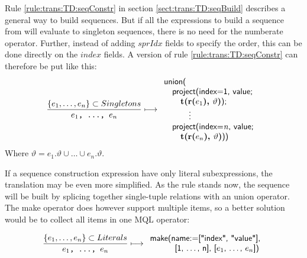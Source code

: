Rule \ref{rule:trans:TD:seqConstr} in section \ref{sect:trans:TD:seqBuild} describes a general way to build
sequences. But if all the expressions to build a sequence from will evaluate to singleton sequences, there is no
need for the \textsf{numberate} operator. Further, instead of adding $sprIdx$ fields to specify the order, this
can be done directly on the $index$ fields. A version of rule \ref{rule:trans:TD:seqConstr} can therefore be put
like this:
\begin{equation}
\frac{\left\{e_{1},\ldots,e_{n}\right\}\subset{Singletons}}{e_{1}\mbox{\texttt{, \ldots, }}e_{n}}\longmapsto
\begin{array}{l}
\mbox{\textsf{union(}} \\ \quad 
\mbox{\textsf{project(index=1, value; }} \\ \quad \quad 
\mbox{\textbf{t(r(}}e_{1}\mbox{\textbf{), }}\vartheta\mbox{\textbf{)}\textsf{);}} \\ \quad 
\qquad\vdots\\ \quad 
\mbox{\textsf{project(index=}\textit{n}\textsf{, value; }} \\ \quad \quad 
\mbox{\textbf{t(r(}}e_{n}\mbox{\textbf{), }}\vartheta\mbox{\textbf{)}\textsf{))}}
\end{array}
\label{rule:trans:TD:seqIfSingl}
\end{equation}
Where $\vartheta=e_{1}.\vartheta \cup \ldots \cup e_{n}.\vartheta$.

If a sequence construction expression have only literal subexpressions, the translation may be even more
simplified. As the rule stands now, the sequence will be built by splicing together single-tuple relations with an
\textsf{union} operator. The \textsf{make} operator does however support multiple items, so a better solution
would be to collect all items in one MQL operator:

\begin{equation}
\frac{\left\{e_{1},\ldots,e_{n}\right\}\subset{Literals}}{e_{1}\mbox{\texttt{, \ldots, }}e_{n}}\longmapsto
\begin{array}{l}
\mbox{\textsf{make(name:=["index", "value"],}} \\ \quad\quad\quad
\mbox{\textsf{[1, \ldots, n], [}}e_{1}\mbox{\textsf{, \ldots, }}e_{n}\mbox{\textsf{])}}
\end{array}
\label{rule:trans:TD:seqIfLit}
\end{equation}

